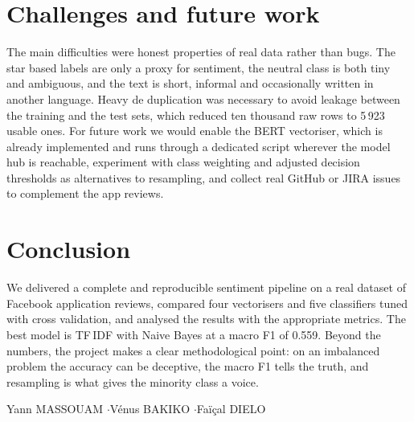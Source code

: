 \documentclass[11pt,a4paper]{article}
\begin{document}
\section{Challenges and future work}
The main difficulties were honest properties of real data rather than bugs. The star
based labels are only a proxy for sentiment, the neutral class is both tiny and
ambiguous, and the text is short, informal and occasionally written in another
language. Heavy de duplication was necessary to avoid leakage between the training and
the test sets, which reduced ten thousand raw rows to 5\,923 usable ones. For future
work we would enable the BERT vectoriser, which is already implemented and runs through
a dedicated script wherever the model hub is reachable, experiment with class weighting
and adjusted decision thresholds as alternatives to resampling, and collect real GitHub
or JIRA issues to complement the app reviews.

\section{Conclusion}
We delivered a complete and reproducible sentiment pipeline on a real dataset of
Facebook application reviews, compared four vectorisers and five classifiers tuned with
cross validation, and analysed the results with the appropriate metrics. The best model
is TF\,IDF with Naive Bayes at a macro F1 of 0.559. Beyond the numbers, the project
makes a clear methodological point: on an imbalanced problem the accuracy can be
deceptive, the macro F1 tells the truth, and resampling is what gives the minority
class a voice.

\vfill
\begin{center}
\small\textcolor{primary}{Yann MASSOUAM \quad$\cdot$\quad Vénus BAKIKO \quad$\cdot$\quad Faïçal DIELO}
\end{center}
\end{document}
